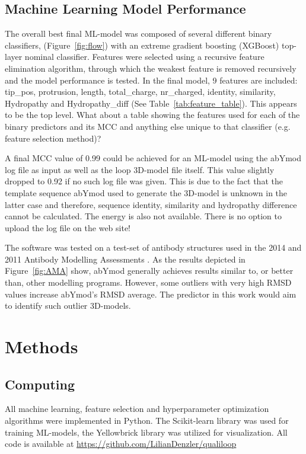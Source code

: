 \documentclass[12pt]{article}
\newcommand{\lilian}[1]{ {\color{red}{\bfseries Lilian:} #1}}
\begin{document}
\subsection{Machine Learning Model Performance}
The overall best final ML-model was composed of several different binary
classifiers, (Figure~\ref{fig:flow}) with an extreme gradient boosting (XGBoost) top-layer
nominal classifier. Features were selected using a recursive feature
elimination algorithm, through which the weakest feature is removed
recursively and the model performance is tested. In the final model, 9
features are included: tip\_pos, protrusion, length, total\_charge, nr\_charged,
identity, similarity, Hydropathy and Hydropathy\_diff
(See Table~\ref{tab:feature_table}).
\lilian{This appears to be the top level. What about a table showing the features used for each of the binary predictors and its MCC and anything else unique to that classifier (e.g. feature selection method)?}

A final MCC value of 0.99 could be achieved for an ML-model
using the abYmod log file as input as well as the loop 3D-model file
itself. This value slightly dropped to 0.92 if no such log file was
given. This is due to the fact that the template sequence
abYmod used to generate the 3D-model is unknown in the latter case
and therefore, sequence identity, similarity and hydropathy difference cannot be calculated. The energy is also not available.
\lilian{There is no option to upload the log file on the web site!}


The software
was tested on a test-set of antibody structures used in the 2014 and
2011 Antibody Modelling Assessments
\cite{Almagro2011,Almagro2014}. As the results depicted in
Figure~\ref{fig:AMA} show, abYmod generally achieves results similar to, or better than,
other modelling programs. However, some outliers with very high RMSD
values increase abYmod's RMSD average. The predictor in this work
would aim to identify such outlier 3D-models.

 
\section{Methods}

\subsection{Computing}
All machine learning, feature selection and hyperparameter
optimization algorithms were implemented in Python. The Scikit-learn
library was used for training ML-models, the
Yellowbrick\cite{Bengfort2021} library was utilized for
visualization. All code is available at
\url{https://github.com/LilianDenzler/qualiloop}
\end{document}
